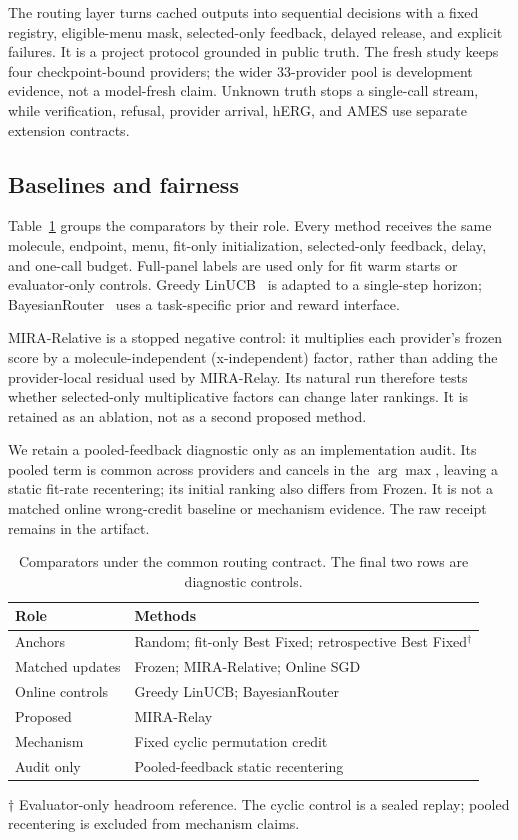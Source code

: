 \documentclass[sigconf,anonymous]{aamas}
\newcommand{\MiraTableFont}{\fontsize{9}{11}\selectfont}
\newcommand{\tnote}[1]{{\fontsize{8.5}{10}\selectfont\raggedright\par\vspace{3pt}#1\par}}
\begin{document}
The routing layer turns cached outputs into sequential decisions with a fixed registry, eligible-menu mask, selected-only feedback, delayed release, and explicit failures. It is a project protocol grounded in public truth. The fresh study keeps four checkpoint-bound providers; the wider 33-provider pool is development evidence, not a model-fresh claim. Unknown truth stops a single-call stream, while verification, refusal, provider arrival, hERG, and AMES use separate extension contracts.

\subsection{Baselines and fairness}
Table~\ref{tab:baselines} groups the comparators by their role. Every method receives the same molecule, endpoint, menu, fit-only initialization, selected-only feedback, delay, and one-call budget. Full-panel labels are used only for fit warm starts or evaluator-only controls. Greedy LinUCB~\cite{poon2026multillm} is adapted to a single-step horizon; BayesianRouter~\cite{wu2026rewardrouting} uses a task-specific prior and reward interface.

MIRA-Relative is a stopped negative control: it multiplies each provider's frozen score by a molecule-independent (x-independent) factor, rather than adding the provider-local residual used by MIRA-Relay. Its natural run therefore tests whether selected-only multiplicative factors can change later rankings. It is retained as an ablation, not as a second proposed method.

We retain a pooled-feedback diagnostic only as an implementation audit. Its
pooled term is common across providers and cancels in the $\arg\max$, leaving
a static fit-rate recentering; its initial ranking also differs from Frozen. It
is not a matched online wrong-credit baseline or mechanism evidence. The raw
receipt remains in the artifact.

\begin{table}[t]
\caption{Comparators under the common routing contract. The final two rows are diagnostic controls.}
\label{tab:baselines}
\MiraTableFont
\setlength{\tabcolsep}{4pt}
\begin{tabular}{@{}lp{}@{}}
\toprule
Role & Methods \\
\midrule
Anchors & Random; fit-only Best Fixed; retrospective Best Fixed$^{\dagger}$ \\
Matched updates & Frozen; MIRA-Relative; Online SGD \\
Online controls & Greedy LinUCB; BayesianRouter \\
Proposed & MIRA-Relay \\
\midrule
Mechanism & Fixed cyclic permutation credit \\
Audit only & Pooled-feedback static recentering \\
\bottomrule
\end{tabular}
\tnote{$\dagger$ Evaluator-only headroom reference. The cyclic control is a sealed replay; pooled recentering is excluded from mechanism claims.}
\end{table}
\end{document}
